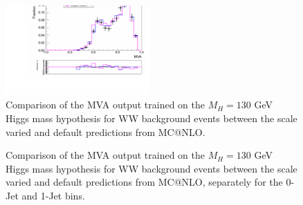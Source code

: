 \begin{figure}[!htbp]
\begin{center}
\includegraphics[width=0.49\textwidth]{figures/ShapeSystematics_WW0JetBin_MVA130_MCAtNLOScaleVariation.pdf}
\caption{Comparison of the MVA output trained on the $M_{H}=130$ GeV Higgs mass hypothesis 
for WW background events between the scale varied and default predictions from MC@NLO.
}
\label{fig:wwshape_scalevariation_MVA130_MCAtNLO}
\end{center}
\end{figure}

\begin{figure}[!htbp]
\begin{center}
\caption{Comparison of the MVA output trained on the $M_{H}=130$ GeV Higgs mass hypothesis
for WW background events between the scale varied and default predictions from MC@NLO,
separately for the 0-Jet and 1-Jet bins.
}
\label{fig:wwshape_scalevariation_MVA130_MadgrahVsMCAtNLO}
\end{center}
\end{figure}

